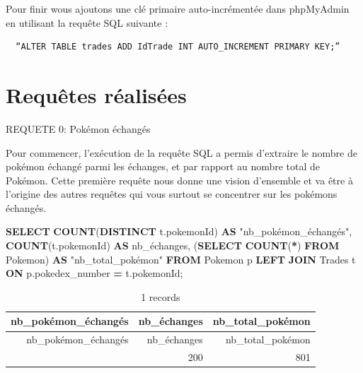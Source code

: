 \documentclass[mstat,12pt]{unswthesis}
\newenvironment{Shaded}{\begin{snugshade}}{\end{snugshade}}
\newcommand{\FunctionTok}[1]{\textcolor[rgb]{0.13,0.29,0.53}{\textbf{#1}}}
\newcommand{\KeywordTok}[1]{\textcolor[rgb]{0.13,0.29,0.53}{\textbf{#1}}}
\newcommand{\NormalTok}[1]{#1}
\newcommand{\OperatorTok}[1]{\textcolor[rgb]{0.81,0.36,0.00}{\textbf{#1}}}
\newcommand{\OtherTok}[1]{\textcolor[rgb]{0.56,0.35,0.01}{#1}}
\begin{document}
\bigskip

Pour finir wous ajoutons une clé primaire auto-incrémentée dans
phpMyAdmin en utilisant la requête SQL suivante :

\bigskip

\begin{verbatim}
  “ALTER TABLE trades ADD IdTrade INT AUTO_INCREMENT PRIMARY KEY;”
\end{verbatim}

\chapter{Requêtes réalisées}\label{requuxeates-ruxe9alisuxe9es}

\bigskip

REQUETE 0: Pokémon échangés

\bigskip

Pour commencer, l'exécution de la requête SQL a permis d'extraire le
nombre de pokémon échangé parmi les échanges, et par rapport au nombre
total de Pokémon. Cette première requête nous donne une vision
d'ensemble et va être à l'origine des autres requêtes qui vous surtout
se concentrer sur les pokémons échangés.

\begin{Shaded}
\begin{Highlighting}[]
\KeywordTok{SELECT} 
    \FunctionTok{COUNT}\NormalTok{(}\KeywordTok{DISTINCT}\NormalTok{ t.pokemonId) }\KeywordTok{AS} \OtherTok{"nb\_pokémon\_échangés"}\NormalTok{,}
    \FunctionTok{COUNT}\NormalTok{(t.pokemonId) }\KeywordTok{AS}\NormalTok{ nb\_échanges,}
\NormalTok{   (}\KeywordTok{SELECT} \FunctionTok{COUNT}\NormalTok{(}\OperatorTok{*}\NormalTok{) }\KeywordTok{FROM}\NormalTok{ Pokemon) }\KeywordTok{AS} \OtherTok{"nb\_total\_pokémon"}
\KeywordTok{FROM}\NormalTok{ Pokemon p}
\KeywordTok{LEFT} \KeywordTok{JOIN}\NormalTok{ Trades t }\KeywordTok{ON}\NormalTok{ p.pokedex\_number }\OperatorTok{=}\NormalTok{ t.pokemonId;}
\end{Highlighting}
\end{Shaded}

\begin{longtable}[]{@{}rrr@{}}
\caption{1 records}\tabularnewline
\toprule\noalign{}
nb\_pokémon\_échangés & nb\_échanges & nb\_total\_pokémon \\
\midrule\noalign{}
\endfirsthead
\toprule\noalign{}
nb\_pokémon\_échangés & nb\_échanges & nb\_total\_pokémon \\
\midrule\noalign{}
\endhead
\bottomrule\noalign{}
\endlastfoot
119 & 200 & 801 \\
\end{longtable}
\end{document}
